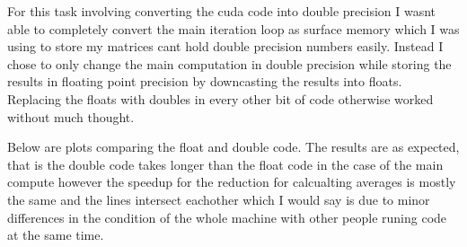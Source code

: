 \documentclass[a4paper]{article}
\begin{document}
	For this task involving converting the cuda code into double precision I wasnt able
	to completely convert the main iteration loop as surface memory which I was using 
	to store my matrices cant hold double precision numbers easily. Instead I chose to 
	only change the main computation in double precision while storing the results in 
	floating point precision by downcasting the results into floats. Replacing the floats
	with doubles in every other bit of code otherwise worked without much thought.

	Below are plots comparing the float and double code. The results are as expected,
	that is the double code takes longer than the float code in the case of the main
	compute however the speedup for the reduction for calcualting averages is mostly the
	same and the lines intersect eachother which I would say is due to minor differences
	in the condition of the whole machine with other people runing code at the same time. 
	
\end{document}
